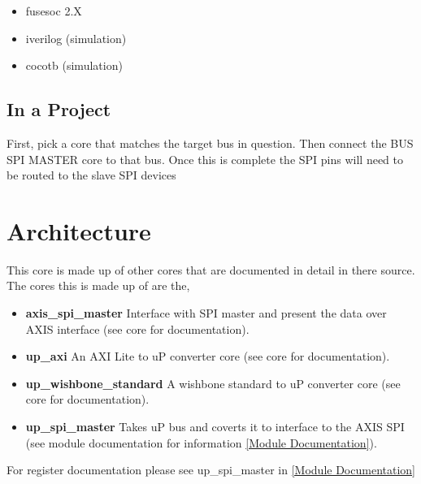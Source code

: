 \begin{itemize}
  \item fusesoc 2.X
  \item iverilog (simulation)
  \item cocotb (simulation)
\end{itemize}







\subsection{In a Project}
\par
First, pick a core that matches the target bus in question. Then connect the BUS SPI MASTER core to that bus. Once this is complete the SPI pins will need
to be routed to the slave SPI devices

\section{Architecture}
\par
This core is made up of other cores that are documented in detail in there source. The cores this is made up of are the,
\begin{itemize}
  \item \textbf{axis\_spi\_master} Interface with SPI master and present the data over AXIS interface (see core for documentation).
  \item \textbf{up\_axi} An AXI Lite to uP converter core (see core for documentation).
  \item \textbf{up\_wishbone\_standard} A wishbone standard to uP converter core (see core for documentation).
  \item \textbf{up\_spi\_master} Takes uP bus and coverts it to interface to the AXIS SPI (see module documentation for information \ref{Module Documentation}).
\end{itemize}

For register documentation please see up\_spi\_master in \ref{Module Documentation}

